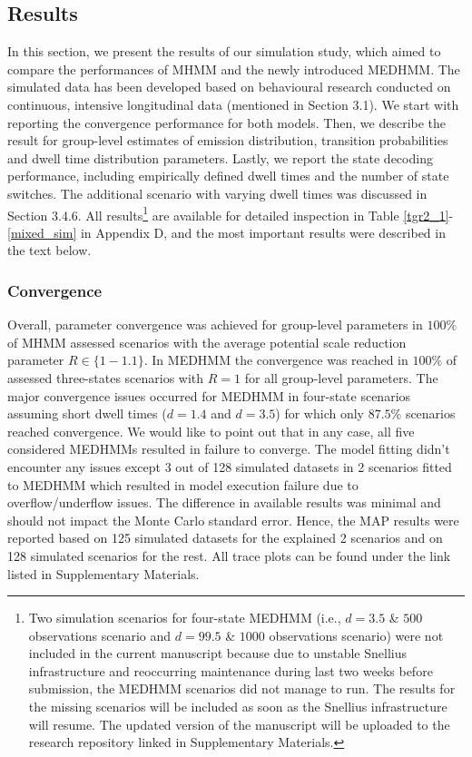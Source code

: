 \subsection{Results}
In this section, we present the results of our simulation study, which aimed to compare the performances of MHMM and the newly introduced MEDHMM. The simulated data has been developed based on behavioural research conducted on continuous, intensive longitudinal data (mentioned in Section 3.1). We start with reporting the convergence performance for both models. Then, we describe the result for group-level estimates of emission distribution, transition probabilities and dwell time distribution parameters. Lastly, we report the state decoding performance, including empirically defined dwell times and the number of state switches. The additional scenario with varying dwell times was discussed in Section 3.4.6. All results\footnote{Two simulation scenarios for four-state MEDHMM (i.e., $d=3.5$ \& $500$ observations scenario and $d=99.5$ \& $1000$ observations scenario) were not included in the current manuscript because due to unstable Snellius infrastructure and reoccurring maintenance during last two weeks before submission, the MEDHMM scenarios did not manage to run. The results for the missing scenarios will be included as soon as the Snellius infrastructure will resume. The updated version of the manuscript will be uploaded to the research repository linked in Supplementary Materials.} are available for detailed inspection in Table \ref{tgr2_1}-\ref{mixed_sim} in Appendix D, and the most important results were described in the text below. 

\subsubsection{Convergence}
Overall, parameter convergence was achieved for group-level parameters in $100\%$ of MHMM assessed scenarios with the average potential scale reduction parameter $R \in \{1-1.1\}$. In MEDHMM the convergence was reached in $100\%$ of assessed three-states scenarios with $R=1$ for all group-level parameters. The major convergence issues occurred for MEDHMM in four-state scenarios assuming short dwell times ($d=1.4$ and $d=3.5$) for which only $87.5\%$ scenarios reached convergence. We would like to point out that in any case, all five considered MEDHMMs resulted in failure to converge. The model fitting didn't encounter any issues except 3 out of 128 simulated datasets in 2 scenarios fitted to MEDHMM which resulted in model execution failure due to overflow/underflow issues. The difference in available results was minimal and should not impact the Monte Carlo standard error. Hence, the MAP results were reported based on 125 simulated datasets for the explained 2 scenarios and on 128 simulated scenarios for the rest.  All trace plots can be found under the link listed in Supplementary Materials.


